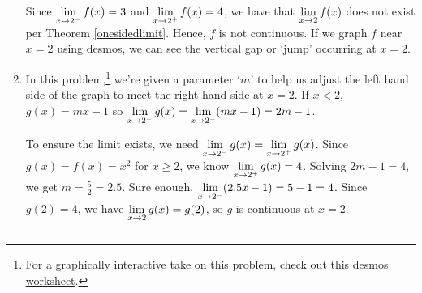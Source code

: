 \documentclass{ximera}
\begin{document}
\begin{example}
\begin{enumerate}
\medskip

Since $\ds{\lim_{x \rightarrow 2^{-}} f(x) = 3}$ and $\ds{\lim_{x \rightarrow 2^{+}} f(x) = 4}$, we have that $\ds{\lim_{x \rightarrow 2} f(x)}$ does not exist per Theorem \ref{onesidedlimit}.  Hence, $f$ is not continuous.  If we graph $f$ near $x=2$ using desmos, we can see the vertical gap or `jump' occurring at $x = 2$.  

\medskip

\item In this problem,\footnote{For a graphically interactive take on this problem, check out this \href{https://www.desmos.com/calculator/ibtrzesg4i}{\underline{desmos worksheet}}.}  we're given a parameter `$m$' to help us adjust the left hand side of the graph to meet the right hand side at $x = 2$.  If $x<2$, $g(x) = mx-1$ so $\ds{\lim_{x \rightarrow 2^{-}} g(x) = \lim_{x \rightarrow 2^{-}} (mx-1) = 2m-1}$. 

\medskip

To ensure the limit exists, we need  $\ds{\lim_{x \rightarrow 2^{-}} g(x) = \lim_{x \rightarrow 2^{+}} g(x)}$.  Since $g(x) = f(x) = x^2$ for $x \geq 2$, we know $\ds{ \lim_{x \rightarrow 2^{+}} g(x) = 4}$.  Solving  $2m-1 = 4$, we get $m = \frac{5}{2} = 2.5$.  Sure enough, $\ds{\lim_{x \rightarrow 2^{-}} (2.5x-1) = 5 - 1 = 4}$.  Since $g(2) = 4$, we have $\ds{\lim_{x \rightarrow 2} g(x) = g(2)}$, so $g$ is continuous at $x = 2$. 

\begin{center}

\begin{tabular}{cc}


\end{tabular}
\end{center}
\end{enumerate}
\end{example}
\end{document}
